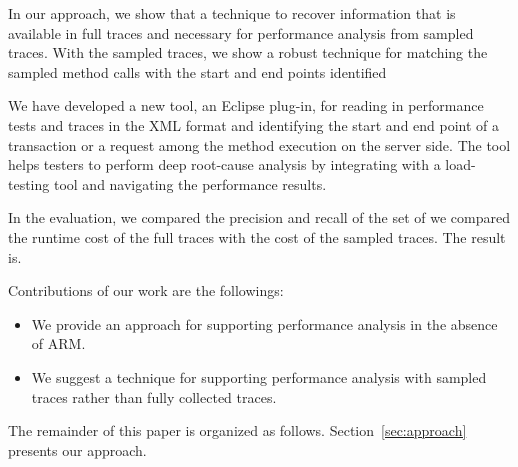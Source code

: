 In our approach, we show that a technique to recover information that is available in full traces and necessary for performance analysis from sampled traces. 
With the sampled traces, we show a robust technique for matching the sampled method calls with the start and end points identified

We have developed a new tool, an Eclipse plug-in, for reading in performance tests and traces in the XML format and identifying the start and end point of a transaction or a request among the method execution on the server side. The tool helps testers to perform deep root-cause analysis by integrating with a load-testing tool and navigating the performance results.

In the evaluation, we compared the precision and recall of the set of we compared the runtime cost of the full traces with the cost of the sampled traces. {The result is.}


Contributions of our work are the followings:
\begin{itemize}
\item We provide an approach for supporting performance analysis in the absence of ARM. \vspace*{-1ex}
\item We suggest a technique for supporting performance analysis with sampled traces rather than fully collected traces.\vspace*{-1ex}
\end{itemize}

The remainder of this paper is organized as follows.
Section~\ref{sec:approach} presents our approach.


